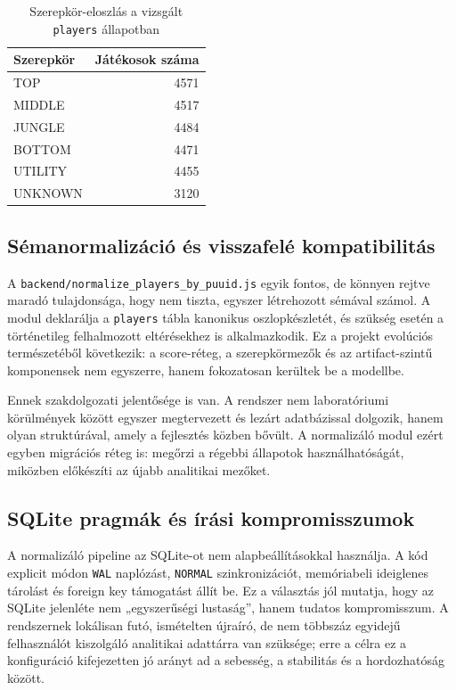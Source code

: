 \documentclass[a4paper,12pt]{report}
\begin{document}
\begin{table}[H]
\centering
\caption{Szerepkör-eloszlás a vizsgált \texttt{players} állapotban}
\begin{tabular}{lr}
\toprule
\textbf{Szerepkör} & \textbf{Játékosok száma} \\
\midrule
TOP & 4571 \\
MIDDLE & 4517 \\
JUNGLE & 4484 \\
BOTTOM & 4471 \\
UTILITY & 4455 \\
UNKNOWN & 3120 \\
\bottomrule
\end{tabular}
\end{table}

\subsection{Sémanormalizáció és visszafelé kompatibilitás}

A \texttt{backend/normalize\_players\_by\_puuid.js} egyik fontos, de könnyen rejtve maradó tulajdonsága, hogy nem tiszta, egyszer létrehozott sémával számol. A modul deklarálja a \texttt{players} tábla kanonikus oszlopkészletét, és szükség esetén a történetileg felhalmozott eltérésekhez is alkalmazkodik. Ez a projekt evolúciós természetéből következik: a score-réteg, a szerepkörmezők és az artifact-szintű komponensek nem egyszerre, hanem fokozatosan kerültek be a modellbe.

Ennek szakdolgozati jelentősége is van. A rendszer nem laboratóriumi körülmények között egyszer megtervezett és lezárt adatbázissal dolgozik, hanem olyan struktúrával, amely a fejlesztés közben bővült. A normalizáló modul ezért egyben migrációs réteg is: megőrzi a régebbi állapotok használhatóságát, miközben előkészíti az újabb analitikai mezőket.

\subsection{SQLite pragmák és írási kompromisszumok}

A normalizáló pipeline az SQLite-ot nem alapbeállításokkal használja. A kód explicit módon \texttt{WAL} naplózást, \texttt{NORMAL} szinkronizációt, memóriabeli ideiglenes tárolást és foreign key támogatást állít be. Ez a választás jól mutatja, hogy az SQLite jelenléte nem „egyszerűségi lustaság”, hanem tudatos kompromisszum. A rendszernek lokálisan futó, ismételten újraíró, de nem többszáz egyidejű felhasználót kiszolgáló analitikai adattárra van szüksége; erre a célra ez a konfiguráció kifejezetten jó arányt ad a sebesség, a stabilitás és a hordozhatóság között.
\end{document}
